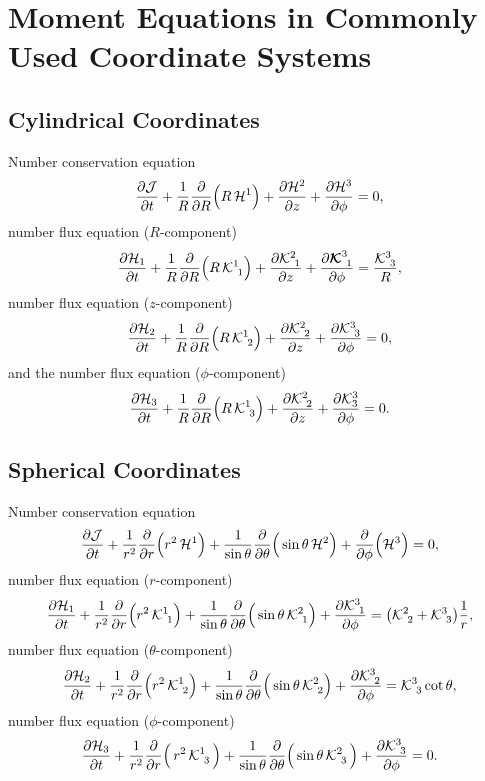 \documentclass[10pt,preprint]{aastex}
\begin{document}
\clearpage

\section{Moment Equations in Commonly Used Coordinate Systems}
\label{app:CurvilinearEuler}

\subsection{Cylindrical Coordinates}

Number conservation equation
\begin{equation}
  \frac{\partial \mathcal{J}}{\partial t}
  +\frac{1}{R}\frac{\partial }{\partial R}\Big(R\,\mathcal{H}^{1}\Big)
  +\frac{\partial \mathcal{H}^{2}}{\partial z}
  +\frac{\partial \mathcal{H}^{3}}{\partial \phi}=0,
\end{equation}
number flux equation ($R$-component)
\begin{equation}
  \frac{\partial \mathcal{H}_{1}}{\partial t}
  +\frac{1}{R}\frac{\partial }{\partial R}\Big(R\,\mathcal{K}^{1}_{~1}\Big)
  +\frac{\partial \mathcal{K}^{2}_{~1}}{\partial z}
  +\frac{\partial \boldsymbol{\mathcal{K}}^{3}_{~1}}{\partial \phi}
  =\frac{\mathcal{K}^{3}_{~3}}{R},
\end{equation}
number flux equation ($z$-component)
\begin{equation}
  \frac{\partial \mathcal{H}_{2}}{\partial t}
  +\frac{1}{R}\frac{\partial }{\partial R}\Big(R\,\mathcal{K}^{1}_{~2}\Big)
  +\frac{\partial \mathcal{K}^{2}_{~2}}{\partial z}
  +\frac{\partial \mathcal{K}^{3}_{~3}}{\partial \phi}=0,
\end{equation}
and the number flux equation ($\phi$-component)
\begin{equation}
  \frac{\partial \mathcal{H}_{3}}{\partial t}
  +\frac{1}{R}\frac{\partial }{\partial R}\Big(R\,\mathcal{K}^{1}_{~3}\Big)
  +\frac{\partial \mathcal{K}^{2}_{~2}}{\partial z}
  +\frac{\partial \mathcal{K}^{3}_{3}}{\partial \phi}=0.
\end{equation}

\subsection{Spherical Coordinates}

Number conservation equation
\begin{equation}
  \frac{\partial \mathcal{J}}{\partial t}
  +\frac{1}{r^{2}}\frac{\partial }{\partial r}\Big(r^{2}\,\mathcal{H}^{1}\Big)
  +\frac{1}{\sin\theta}\frac{\partial }{\partial \theta}\Big(\sin\theta\,\mathcal{H}^{2}\Big)
  +\frac{\partial }{\partial \phi}\Big(\mathcal{H}^{3}\Big)=0,
\end{equation}
number flux equation ($r$-component)
\begin{equation}
  \frac{\partial \mathcal{H}_{1}}{\partial t}
  +\frac{1}{r^{2}}\frac{\partial }{\partial r}\Big(r^{2}\,\mathcal{K}^{1}_{~1}\Big)
  +\frac{1}{\sin\theta}\frac{\partial }{\partial \theta}\Big(\sin\theta\,\mathcal{K}^{2}_{~1}\Big)
  +\frac{\partial \mathcal{K}^{3}_{~1}}{\partial \phi}
  =\big(\mathcal{K}^{2}_{~2}+\mathcal{K}^{3}_{~3}\big)\frac{1}{r},
\end{equation}
number flux equation ($\theta$-component)
\begin{equation}
  \frac{\partial \mathcal{H}_{2}}{\partial t}
  +\frac{1}{r^{2}}\frac{\partial }{\partial r}\Big(r^{2}\,\mathcal{K}^{1}_{~2}\Big)
  +\frac{1}{\sin\theta}\frac{\partial }{\partial \theta}\Big(\sin\theta\,\mathcal{K}^{2}_{~2}\Big)
  +\frac{\partial \mathcal{K}^{3}_{~2}}{\partial \phi}
  =\mathcal{K}^{3}_{~3}\cot\theta,
\end{equation}
number flux equation ($\phi$-component)
\begin{equation}
  \frac{\partial \mathcal{H}_{3}}{\partial t}
  +\frac{1}{r^{2}}\frac{\partial }{\partial r}\Big(\,r^{2}\,\mathcal{K}^{1}_{~3}\,\Big)
  +\frac{1}{\sin\theta}\frac{\partial }{\partial \theta}\Big(\sin\theta\,\mathcal{K}^{2}_{~3}\,\Big)
  +\frac{\partial \mathcal{K}^{3}_{~3}}{\partial \phi}=0.
\end{equation}
\end{document}
